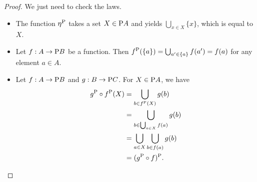 \documentclass[DynamicalBook]{subfiles}
\begin{document}
\begin{proof}
  We just need to check the laws.
  \begin{itemize}
    \item The function $\eta^{\mathrm{P}}$ takes a set $X \in \mathrm{P} A$ and
      yields $\bigcup_{x \in X} \{x\}$, which is equal to $X$.
    \item Let $f : A \to \mathrm{P} B$ be a function. Then $f^{\mathrm{P}}(\{a\}) =
      \bigcup_{a' \in \{a\}}f(a') = f(a)$ for any element $a \in A$.
    \item Let $f : A \to \mathrm{P} B$ and $g : B \to \mathrm{P} C$. For $X \in
      \mathrm{P} A$, we have
\begin{align*}
  g^{\mathrm{P}} \circ f^{\mathrm{P}}(X) &= \bigcup_{b \in f^{\mathrm{P}}(X)} g(b) \\
&= \bigcup_{b \in \bigcup_{a \in X} f(a)} g(b) \\
&= \bigcup_{a \in X} \bigcup_{b \in f(a)} g(b) \\
&= (g^{\mathrm{P}} \circ f)^{\mathrm{P}}.
\end{align*}
  \end{itemize}
  

\end{proof}
\end{document}
